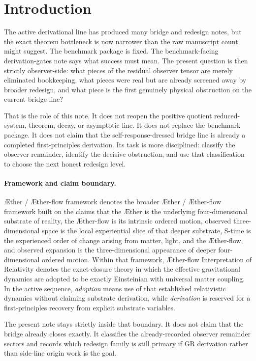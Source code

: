 \documentclass[11pt]{article}
\newcommand{\Aether}{\AE{}ther}
\newcommand{\Aflow}{\AE{}ther-flow}
\newcommand{\TheoryName}{\Aflow{} Interpretation of Relativity}
\newcommand{\TheoryProgram}{\Aether{} / \Aflow{} framework}
\begin{document}
\section{Introduction}

The active derivational line has produced many bridge and redesign notes, but the exact theorem bottleneck is now narrower than the raw manuscript count might suggest. The benchmark package is fixed. The benchmark-facing derivation-gates note says what success must mean. The present question is then strictly observer-side: what pieces of the residual observer tensor are merely eliminated bookkeeping, what pieces were real but are already screened away by broader redesign, and what piece is the first genuinely physical obstruction on the current bridge line?

That is the role of this note. It does not reopen the positive quotient reduced-system, theorem, decay, or asymptotic line. It does not replace the benchmark package. It does not claim that the self-response-dressed bridge line is already a completed first-principles derivation. Its task is more disciplined: classify the observer remainder, identify the decisive obstruction, and use that classification to choose the next honest redesign level.

\paragraph{Framework and claim boundary.}
\TheoryProgram{} denotes the broader \Aether{} / \Aflow{} framework built on the claims that the \Aether{} is the underlying four-dimensional substrate of reality, the \Aflow{} is its intrinsic ordered motion, observed three-dimensional space is the local experiential slice of that deeper substrate, S-time is the experienced order of change arising from matter, light, and the \Aflow{}, and observed expansion is the three-dimensional appearance of deeper four-dimensional ordered motion. Within that framework, \TheoryName{} denotes the exact-closure theory in which the effective gravitational dynamics are adopted to be exactly Einsteinian with universal matter coupling. In the active sequence, \emph{adoption} means use of that established relativistic dynamics without claiming substrate derivation, while \emph{derivation} is reserved for a first-principles recovery from explicit substrate variables.

The present note stays strictly inside that boundary. It does not claim that the bridge already closes exactly. It classifies the already-recorded observer remainder sectors and records which redesign family is still primary if GR derivation rather than side-line origin work is the goal.
\end{document}

